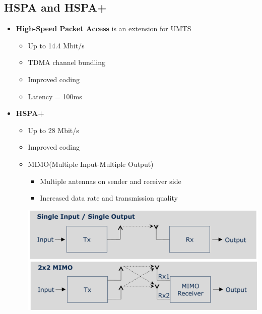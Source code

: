 \subsection{HSPA and HSPA+}
\begin{itemize}
    \item \textbf{High-Speed Packet Access} is an extension for UMTS
        \begin{itemize}
            \item Up to 14.4 Mbit/s
            \item TDMA channel bundling
            \item Improved coding
            \item Latency = 100ms
        \end{itemize}

    \item \textbf{HSPA+}
        \begin{itemize}
            \item Up to 28 Mbit/s
            \item Improved coding
            \item MIMO(Multiple Input-Multiple Output)
                \begin{itemize}
                    \item Multiple antennas on sender and receiver side
                    \item Increased data rate and transmission quality
                \end{itemize}
                \begin{center}
                    \includegraphics[width=0.7\linewidth]{img/mimo.png}
                \end{center}
        \end{itemize}
\end{itemize}


